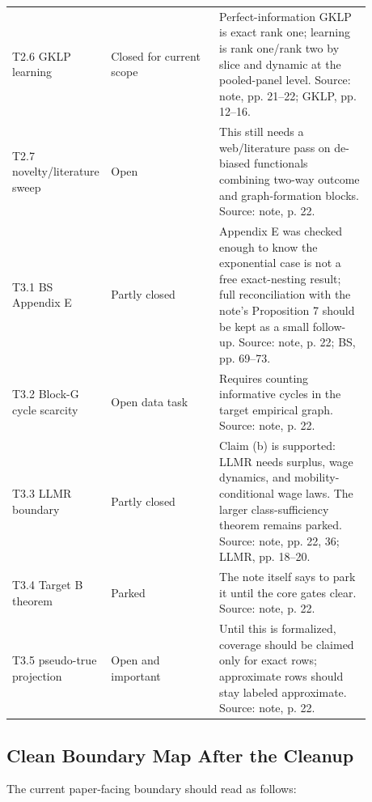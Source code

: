 \documentclass[11pt]{article}
\begin{document}
\begin{longtable}{>{\raggedright\arraybackslash}p{0.16\linewidth}
                  >{\raggedright\arraybackslash}p{0.30\linewidth}
                  >{\raggedright\arraybackslash}p{0.42\linewidth}}
T2.6 GKLP learning & Closed for current scope & Perfect-information GKLP is exact rank one; learning is rank one/rank two by slice and dynamic at the pooled-panel level. Source: note, pp. 21--22; GKLP, pp. 12--16. \\
T2.7 novelty/literature sweep & Open & This still needs a web/literature pass on de-biased functionals combining two-way outcome and graph-formation blocks. Source: note, p. 22. \\
T3.1 BS Appendix E & Partly closed & Appendix E was checked enough to know the exponential case is not a free exact-nesting result; full reconciliation with the note's Proposition 7 should be kept as a small follow-up. Source: note, p. 22; BS, pp. 69--73. \\
T3.2 Block-G cycle scarcity & Open data task & Requires counting informative cycles in the target empirical graph. Source: note, p. 22. \\
T3.3 LLMR boundary & Partly closed & Claim (b) is supported: LLMR needs surplus, wage dynamics, and mobility-conditional wage laws. The larger class-sufficiency theorem remains parked. Source: note, pp. 22, 36; LLMR, pp. 18--20. \\
T3.4 Target B theorem & Parked & The note itself says to park it until the core gates clear. Source: note, p. 22. \\
T3.5 pseudo-true projection & Open and important & Until this is formalized, coverage should be claimed only for exact rows; approximate rows should stay labeled approximate. Source: note, p. 22. \\
\bottomrule
\end{longtable}

\subsection{Clean Boundary Map After the Cleanup}

The current paper-facing boundary should read as follows:
\end{document}
